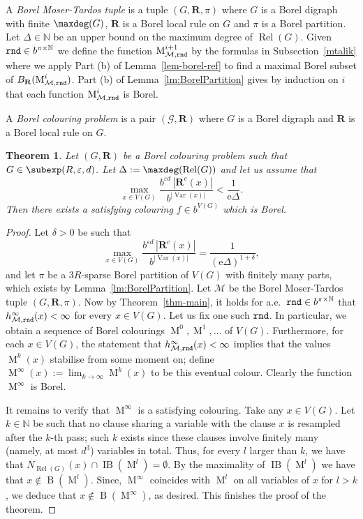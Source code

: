 \documentclass[12pt,a4paper]{article}
\numberwithin{equation}{section}
\newtheorem{theorem}[equation]{Theorem} %
\theoremstyle{definition}
\newcommand{\eps}{{\varepsilon}}
\newcommand{\de}{{\delta}}
\newcommand{\De}{{\Delta}}
\newcommand\NN{\mathbb N}
\renewcommand{\cal}[1]{{\mathcal #1}}
\newcommand\MT{\operatorname{M}}
\newcommand\B{\operatorname{B}}
\newcommand\IB{\operatorname{IB}}
\newcommand\Rel{\operatorname{Rel}}
\newcommand\Var{\operatorname{Var}}
\newcommand{\me}{\mathrm{e}}
\newcommand{\nn}{R}
\begin{document}
    A \emph{Borel Moser-Tardos tuple} is a tuple $(G, \mathbf R, \pi)$ 
    where $G$ is a Borel digraph with finite $\maxdeg(G)$, $\mathbf R$ is a Borel local rule on $G$ 
    and $\pi$ is a Borel partition. Let $\Delta\in\NN$ be an upper bound on the maximum degree of $\Rel(G)$. Given $\rnd\in b^{\pi\times \NN}$ we 
    define the function $\MT^{i+1}_{\cal M, \rnd}$ by the formulas in 
    Subsection~\ref{mtalik} where we apply Part (b) of Lemma~\ref{lem-borel-ref} to find a maximal Borel subset of $B_{\mathbf R}(\MT^{i}_{\cal M, \rnd})$. Part (b) of Lemma~\ref{lm:BorelPartition} gives by induction on $i$ that each function $\MT^{i}_{\cal M, \rnd}$ is Borel.
    
    A \emph{Borel colouring problem} is a pair $(\cal G,\mathbf R)$ where $G$ is a Borel digraph and $\mathbf R$ is a Borel local rule on $G$.
    
    \begin{theorem}\label{thm-main-borel}
    Let $( G, \mathbf R)$ be a Borel colouring problem such that $G\in \subexp(\nn,\eps,d)$. Let $\De:=\maxdeg(\Rel(G))$ and let us assume that 
    $$
    \max_{x\in V(G)} \frac{b^{\eps d}\,|\mathbf R^c(x)|}{b^{|\Var(x)|}} < \frac{1}{\me\De}.
    $$
    Then there exists a satisfying colouring $f\in b^{V(G)}$ which is Borel.
    \end{theorem}
    \begin{proof}
    Let $\de>0$ be such that 
    $$
    \max_{x\in V(G)}\frac{b^{\eps d}\,|\mathbf R^c(x)|}{b^{|\Var(x)|}} = \frac{1}{(\me\De)^{1+\delta}},
    $$
    and let $\pi$ be a $3\nn$-sparse Borel partition of $V(G)$ with finitely many parts, which exists by Lemma~\ref{lm:BorelPartition}. Let $\cal M$ be the Borel Moser-Tardos tuple $(G, \mathbf R, \pi)$. Now by Theorem~\ref{thm-main}, it holds for a.e.~$\rnd\in b^{\pi\times \NN}$ that $h^\infty_{\cal M,\rnd}(x)<\infty$ for every $x\in V(G)$.  Let us fix one such $\normalfont{\texttt{rnd}}$. In particular, we obtain a sequence of Borel colourings $\MT^0,\MT^1,\ldots$ of $V(G)$. Furthermore, for each $x\in V(G)$, the statement that $h^\infty_{\cal M,\rnd}(x) <\infty$ implies that the values $\MT^k(x)$ stabilise from some moment on; define $\MT^\infty(x):=\lim_{k\to\infty} \MT^k(x)$ to be this eventual colour. 
    Clearly the function $\MT^\infty$ is Borel.%
    
    It remains to verify that  $\MT^\infty$ is a satisfying colouring. Take any  $x\in V(G)$. Let $k\in \NN$ be such that 
    no clause sharing a variable with the clause $x$ is resampled after the $k$-th pass; such $k$ exists since these clauses involve finitely many (namely, at most $d^3$) variables in total.
    Thus, for every $l$ larger than $k$, we have that $N_{\Rel(G)}(x)\cap  \IB(\MT^l) = \emptyset$. By the maximality of $\IB(\MT^l)$ we have that $x\notin \B(\MT^l)$. Since,  $\MT^\infty$ coincides with $\MT^l$ on all variables of $x$ for $l>k$, we deduce that $x\notin \B(\MT^\infty)$, as desired. This finishes the proof of the theorem.
    \end{proof}
    
\end{document}
